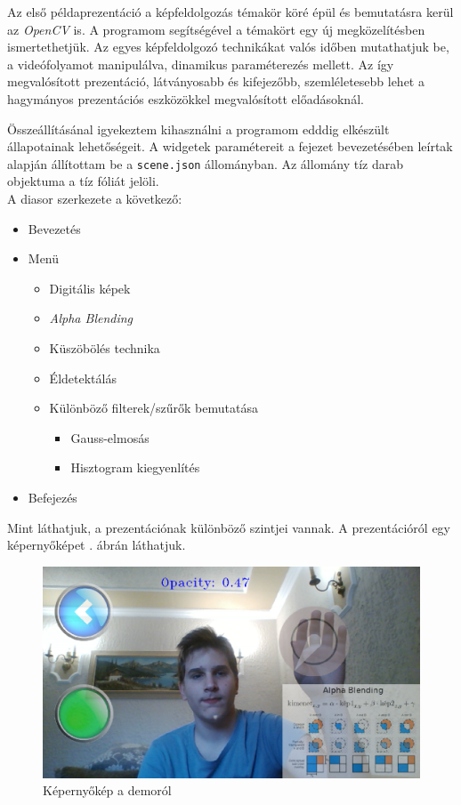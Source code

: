 
Az első példaprezentáció a képfeldolgozás témakör köré épül és bemutatásra kerül az \textit{OpenCV} is. A programom segítségével a témakört egy új megközelítésben ismertethetjük. Az egyes képfeldolgozó technikákat valós időben mutathatjuk be, a videófolyamot manipulálva, dinamikus paraméterezés mellett. Az így megvalósított prezentáció, látványosabb és kifejezőbb, szemléletesebb lehet a hagymányos prezentációs eszközökkel megvalósított előadásoknál.

Összeállításánal igyekeztem kihasználni a programom edddig elkészült állapotainak lehetőségeit. A widgetek paramétereit a fejezet bevezetésében leírtak alapján állítottam be a \texttt{scene.json} állományban. Az állomány tíz darab objektuma a tíz fóliát jelöli.\\
A diasor szerkezete a következő:
\begin{itemize}
	\item Bevezetés
	\item Menü
		\begin{itemize}
			\item Digitális képek
			\item \textit{Alpha Blending}
			\item Küszöbölés technika
			\item Éldetektálás
			\item Különböző filterek/szűrők bemutatása
				\begin{itemize}
					\item Gauss-elmosás
					\item Hisztogram kiegyenlítés
				\end{itemize}
		\end{itemize}
	\item Befejezés
\end{itemize}
Mint láthatjuk, a prezentációnak különböző szintjei vannak. A prezentációról egy képernyőképet . ábrán láthatjuk.

\begin{figure}[h]
\centering
\includegraphics[width=\textwidth]{images/opencv_demo_screenshot.png}
\caption{Képernyőkép a demoról}
\label{fig:opencvdemo}
\end{figure}

